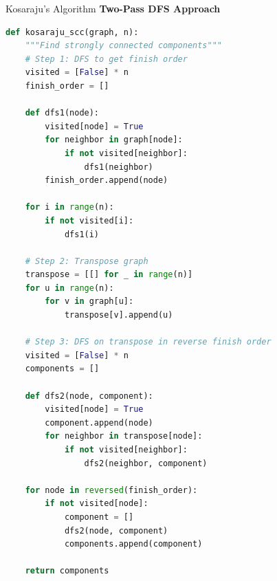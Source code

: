 \documentclass[aspectratio=169]{beamer}
\begin{document}
\begin{frame}[fragile]{Kosaraju's Algorithm}
\textbf{Two-Pass DFS Approach}

\begin{lstlisting}[language=Python, basicstyle=\ttfamily\tiny]
def kosaraju_scc(graph, n):
    """Find strongly connected components"""
    # Step 1: DFS to get finish order
    visited = [False] * n
    finish_order = []

    def dfs1(node):
        visited[node] = True
        for neighbor in graph[node]:
            if not visited[neighbor]:
                dfs1(neighbor)
        finish_order.append(node)

    for i in range(n):
        if not visited[i]:
            dfs1(i)

    # Step 2: Transpose graph
    transpose = [[] for _ in range(n)]
    for u in range(n):
        for v in graph[u]:
            transpose[v].append(u)

    # Step 3: DFS on transpose in reverse finish order
    visited = [False] * n
    components = []

    def dfs2(node, component):
        visited[node] = True
        component.append(node)
        for neighbor in transpose[node]:
            if not visited[neighbor]:
                dfs2(neighbor, component)

    for node in reversed(finish_order):
        if not visited[node]:
            component = []
            dfs2(node, component)
            components.append(component)

    return components
\end{lstlisting}
\end{frame}
\end{document}

